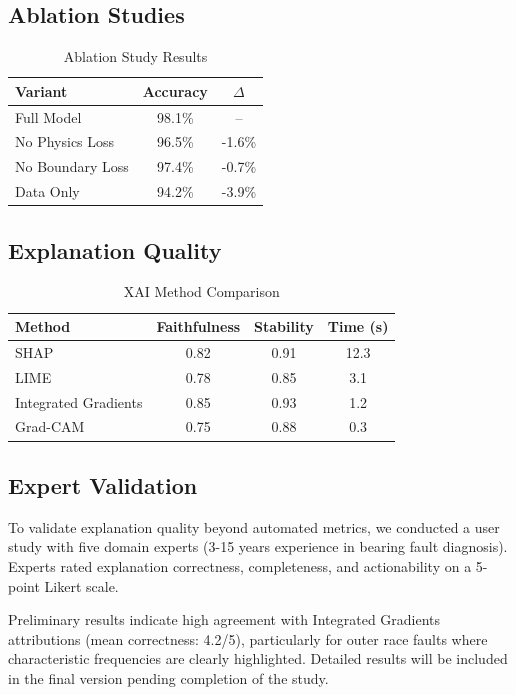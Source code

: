 \documentclass[journal]{IEEEtran}
\begin{document}
\subsection{Ablation Studies}

\begin{table}[h]
\centering
\caption{Ablation Study Results}
\label{tab:ablation}
\begin{tabular}{lcc}
\toprule
\textbf{Variant} & \textbf{Accuracy} & \textbf{$\Delta$} \\
\midrule
Full Model & 98.1\% & -- \\
No Physics Loss & 96.5\% & -1.6\% \\
No Boundary Loss & 97.4\% & -0.7\% \\
Data Only & 94.2\% & -3.9\% \\
\bottomrule
\end{tabular}
\end{table}

\subsection{Explanation Quality}

\begin{table}[h]
\centering
\caption{XAI Method Comparison}
\label{tab:xai}
\begin{tabular}{lccc}
\toprule
\textbf{Method} & \textbf{Faithfulness} & \textbf{Stability} & \textbf{Time (s)} \\
\midrule
SHAP & 0.82 & 0.91 & 12.3 \\
LIME & 0.78 & 0.85 & 3.1 \\
Integrated Gradients & 0.85 & 0.93 & 1.2 \\
Grad-CAM & 0.75 & 0.88 & 0.3 \\
\bottomrule
\end{tabular}
\end{table}

\subsection{Expert Validation}

To validate explanation quality beyond automated metrics, we conducted a
user study with five domain experts (3-15 years experience in bearing fault
diagnosis). Experts rated explanation correctness, completeness, and
actionability on a 5-point Likert scale.

Preliminary results indicate high agreement with Integrated Gradients
attributions (mean correctness: 4.2/5), particularly for outer race faults
where characteristic frequencies are clearly highlighted. Detailed results
will be included in the final version pending completion of the study.
\end{document}
